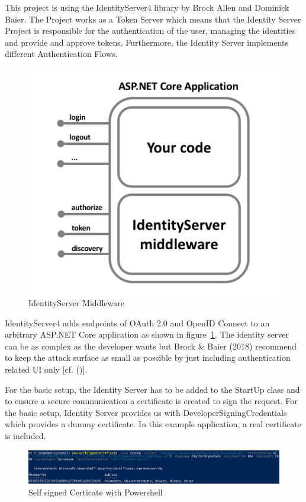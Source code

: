 This project is using the IdentityServer4 library by Brock Allen and Dominick Baier. The Project works as a Token Server which means that the Identity Server Project is responsible for the authentication of the user, managing the identities and provide and approve tokens. Furthermore, the Identity Server implements different Authentication Flows.


\begin{figure}[h]
	\centering
	\includegraphics[width=0.6\linewidth]{images/middlewareIdentityServer}
	\caption{IdentityServer Middleware}
	\label{fig:middlewareidentityserver}
\end{figure}
 

IdentityServer4 adds endpoints of OAuth 2.0 and OpenID Connect to an arbitrary ASP.NET Core application as shown in figure~\ref{fig:middlewareidentityserver}. The identity server can be as complex as the developer wants but Brock \& Baier (2018) recommend to keep the attack surface as small as possible by just including authentication related UI only [cf. (\cite{Brock:2018:ID4})]. 


For the basic setup, the Identity Server has to be added to the StartUp class and to ensure a secure communication a certificate is created to sign the request. For the basic setup, Identity Server provides us with DeveloperSigningCredentials which provides a dummy certificate. In this example application, a real certificate is included. 

\begin{figure}[h]
	\centering
	\includegraphics[width=0.9\linewidth]{images/self-signed-certicate}
	\caption{Self signed Certicate with Powershell}
	\label{fig:self-signed-certicate}
\end{figure}

